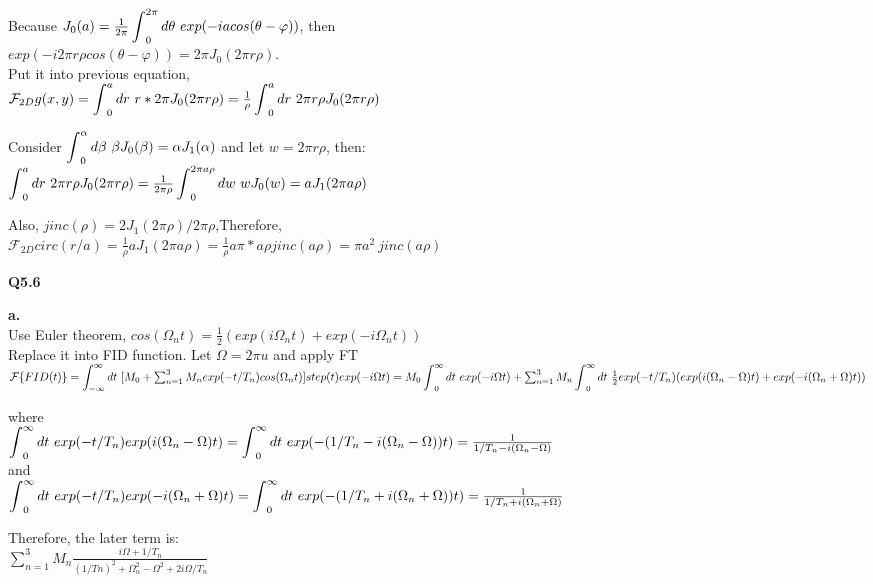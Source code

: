 \documentclass[12pt,a4paper]{article}
\newcommand{\bint}{\mathop{\mathlarger{\int}}}
\newcommand{\infint}{\mathop{\mathlarger{\int_{-\infty}^\infty}}}
\begin{document}
    \vspace{0.5cm}
    \noindent Because $J_0(a)=\frac{1}{2\pi}\bint_0^{2\pi}d\theta\ exp(-iacos(\theta-\varphi))$, then \\
    $exp(-i2\pi r\rho cos(\theta-\varphi))=2\pi J_0(2\pi r\rho)$. \\
    Put it into previous equation, \\
    $\mathcal{F}_{2D}g(x,y)=\bint^a_0dr\ r*2\pi J_0(2\pi r\rho)=\frac{1}{\rho}\bint^a_0dr\ 2\pi r\rho J_0(2\pi r\rho)$

    \noindent Consider $\bint_0^\alpha d\beta\ \beta J_0(\beta)=\alpha J_1(\alpha)$ and let $w=2\pi r\rho$, then:\\
    $\bint^a_0dr\ 2\pi r\rho J_0(2\pi r\rho)=\frac{1}{2\pi\rho}\bint_0^{2\pi a\rho} dw\ w J_0(w)=a J_1(2\pi a\rho)$

    \vspace{0.5cm}
    \noindent Also, $jinc(\rho)=2J_1(2\pi\rho)/2\pi\rho$,Therefore, \\
    $\mathcal{F}_{2D}circ(r/a)=\frac{1}{\rho} a J_1(2\pi a\rho)=\frac{1}{\rho}a\pi* a\rho jinc(a\rho)=\pi a^2\ jinc(a\rho)$

    \newpage
    \Large{\textbf{Q5.6}}

    \textbf{a. }\\
    Use Euler theorem, $cos(\Omega_nt) = \frac{1}{2}(exp(i\Omega_nt)+exp(-i\Omega_nt))$\\
    Replace it into FID function. Let $\Omega=2\pi u$ and apply FT\\
    $\mathcal{F}\{FID(t)\}=\infint dt\ [M_0+\sum_{n=1}^3 M_n exp(-t/T_n)cos(\Omega_n t)]step(t)exp(-i\Omega t)\\
    =M_0\bint_0^\infty dt\ exp(-i\Omega t)+\sum_{n=1}^3M_n\bint_0^\infty dt\ \frac{1}{2}exp(-t/T_n)(exp(i(\Omega_n-\Omega)t)+exp(-i(\Omega_n+\Omega)t))$

    \vspace{0.5cm}
    \noindent where \\
    $\bint_0^\infty dt\ exp(-t/T_n)exp(i(\Omega_n-\Omega)t)\\=\bint_0^\infty dt\ exp(-(1/T_n-i(\Omega_n-\Omega))t)=\frac{1}{1/T_n-i(\Omega_n-\Omega)}$\\
    and\\
    $\bint_0^\infty dt\ exp(-t/T_n)exp(-i(\Omega_n+\Omega)t)\\=\bint_0^\infty dt\ exp(-(1/T_n+i(\Omega_n+\Omega))t)=\frac{1}{1/T_n+i(\Omega_n+\Omega)}$

    \vspace{0.5cm}
    \noindent Therefore, the later term is: \\
    $\sum_{n=1}^3M_n\frac{i\Omega+1/T_n}{(1/Tn)^2+\Omega_n^2-\Omega^2+2i\Omega/T_n}$
\end{document}
